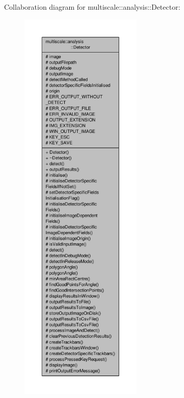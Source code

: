 Collaboration diagram for multiscale\-:\-:analysis\-:\-:Detector\-:
\nopagebreak
\begin{figure}[H]
\begin{center}
\leavevmode
\includegraphics[height=550pt]{classmultiscale_1_1analysis_1_1Detector__coll__graph}
\end{center}
\end{figure}
